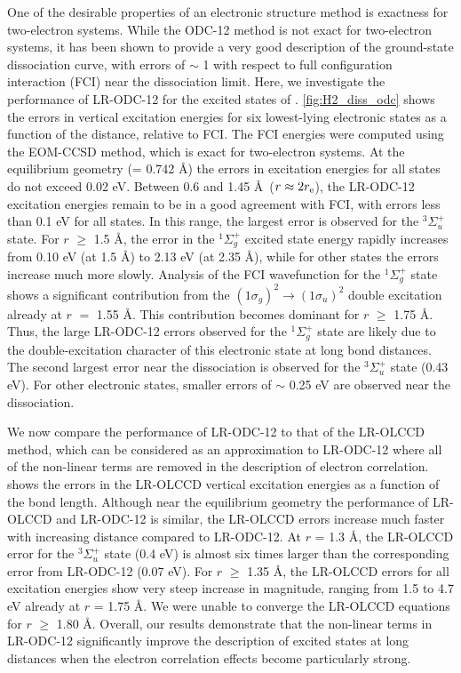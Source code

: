 One of the desirable properties of an electronic structure method is exactness
for two-electron systems. While the ODC-12 method is not exact for two-electron
systems, it has been shown to provide a very good description of the
ground-state  dissociation curve, with errors of $\sim$ 1 \kcal with
respect to full configuration interaction (FCI) near the dissociation
limit.\cite{Sokolov:2013p204110} Here, we investigate the performance of
LR-ODC-12 for the excited states of . \cref{fig:H2_diss_odc} shows the
errors in vertical excitation energies for six lowest-lying electronic states as
a function of the  distance, relative to FCI\@. The FCI energies were
computed using the EOM-CCSD method, which is exact for two-electron systems. At
the equilibrium geometry (\re = 0.742 \AA) the errors in excitation energies
for all states do not exceed 0.02 eV. Between 0.6 and 1.45 \AA\
(\mbox{$r\approx2r_\mathrm{e}$}), the LR-ODC-12 excitation energies remain to be in a
good agreement with FCI, with errors less than 0.1 eV for all states. In this
range, the largest error is observed for the $^3\Sigma_u^+$ state. For $r$ $\ge$
1.5 \AA, the error in the $^1\Sigma_g^+$ excited state energy rapidly increases
from 0.10 eV (at 1.5 \AA) to 2.13 eV (at 2.35 \AA), while for other states the
errors increase much more slowly. Analysis of the FCI wavefunction for the
$^1\Sigma_g^+$ state shows a significant contribution from the
$(1\sigma_g)^2\rightarrow(1\sigma_u)^2$ double excitation already at $r$ $=$
1.55 \AA\@. This contribution becomes dominant for $r$ $\ge$ 1.75 \AA\@.
Thus, the large LR-ODC-12 errors observed for the $^1\Sigma_g^+$ state are
likely due to the double-excitation character of this electronic state at long
\ce{H-H} bond distances.
The second largest error near the dissociation is observed for the
$^3\Sigma_u^+$ state (0.43 eV).
For other electronic states, smaller errors of $\sim$ 0.25 eV are observed near
the dissociation.

We now compare the performance of LR-ODC-12 to that of the LR-OLCCD method,
which can be considered as an approximation to LR-ODC-12 where all of the
non-linear terms are removed in the description of electron correlation.
\Cref{fig:H2_diss_olccd} shows the errors in the LR-OLCCD vertical excitation
energies as a function of the \ce{H-H} bond length.
Although near the equilibrium geometry the performance of LR-OLCCD and LR-ODC-12
is similar, the LR-OLCCD errors increase much faster with increasing \ce{H-H}
distance compared to LR-ODC-12.
At $r$ = 1.3 \AA, the LR-OLCCD error for the $^3\Sigma_u^+$ state (0.4 eV) is
almost six times larger than the corresponding error from LR-ODC-12 (0.07 eV).
For $r$ $\ge$ 1.35 \AA, the LR-OLCCD errors for all excitation energies show
very steep increase in magnitude, ranging from 1.5 to 4.7 eV already at $r$ =
1.75 \AA\@. We were unable to converge the LR-OLCCD equations for $r$ $\ge$ 1.80
\AA\@.
Overall, our results demonstrate that the non-linear terms in LR-ODC-12
significantly improve the description of excited states at long \ce{H-H}
distances when the electron correlation effects become particularly strong.


